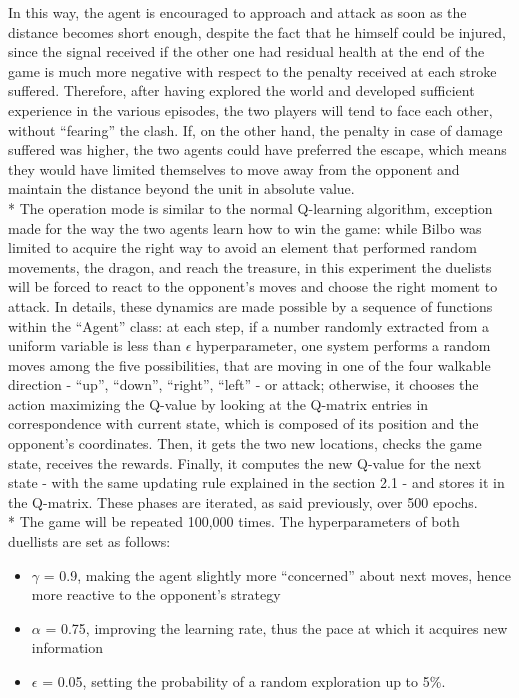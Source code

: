 In this way, the agent is encouraged to approach and attack as soon as the distance becomes short enough, despite the fact that he himself could be injured, since the signal received if the other one had residual health at the end of the game is much more negative with respect to the penalty received at each stroke suffered. Therefore, after having explored the world and developed sufficient experience in the various episodes, the two players will tend to face each other, without ``fearing'' the clash. If, on the other hand, the penalty in case of damage suffered was higher, the two agents could have preferred the escape, which means they would have limited themselves to move away from the opponent and maintain the distance beyond the unit in absolute value.\\*
The operation mode is similar to the normal Q-learning algorithm, exception made for the way the two agents learn how to win the game: while Bilbo was limited to acquire the right way to avoid an element that performed random movements, the dragon, and reach the treasure, in this experiment the duelists will be forced to react to the opponent's moves and choose the right moment to attack. In details, these dynamics are made possible by a sequence of functions within the ``Agent'' class:  at each step, if a number randomly extracted from a uniform variable is less than $\epsilon$ hyperparameter, one system performs a random moves among the five possibilities, that are moving in one of the four walkable direction - ``up'', ``down'', ``right'', ``left'' - or attack; otherwise, it chooses the action maximizing the Q-value by looking at the Q-matrix entries in correspondence with current state, which is composed of its position and the opponent's coordinates. Then, it gets the two new locations, checks the game state, receives the rewards. Finally, it computes the new Q-value for the next state - with the same updating rule explained in the section 2.1 - and stores it in the Q-matrix. These phases are iterated, as said previously, over 500 epochs.\\*
The game will be repeated 100,000 times. The hyperparameters of both duellists are set as follows:
\begin{itemize}[noitemsep, topsep=0ex]
  \item $\gamma$ = 0.9, making the agent slightly more ``concerned'' about next moves, hence more reactive to the opponent's strategy
  \item $\alpha$ = 0.75, improving the learning rate, thus the pace at which it acquires new information
  \item $\epsilon$ = 0.05, setting the probability of a random exploration up to 5\%.
\end{itemize} 
